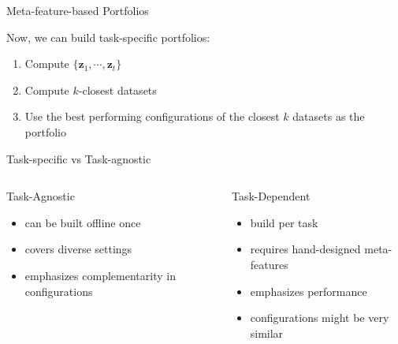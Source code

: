 \documentclass[main]{subfiles}
\begin{document}
\begin{frame}{Meta-feature-based Portfolios}

Now, we can build task-specific portfolios:
\begin{enumerate}
    \item Compute $\{\mathbf{z}_1, \cdots, \mathbf{z}_t\}$
    \item Compute $k$-closest datasets 
    \item Use the best performing configurations of the closest $k$ datasets as the portfolio
\end{enumerate}
   
\end{frame}
\begin{frame}{Task-specific vs Task-agnostic}

%
%
\begin{columns}[T,onlytextwidth]
  \vspace{0pt}
  \begin{block}{\raggedright Task-Agnostic}
\begin{itemize}
    \item can be built offline once
    \item covers diverse settings
    \item emphasizes complementarity in configurations
\end{itemize}
\end{block}
\pause
{}
\begin{block}{\raggedright Task-Dependent}
\begin{itemize}
    \item build per task
    \item requires hand-designed meta-features
    \item emphasizes performance
    \item configurations might be very similar
\end{itemize}
\end{block}
   \end{columns}

\end{frame}
\end{document}
